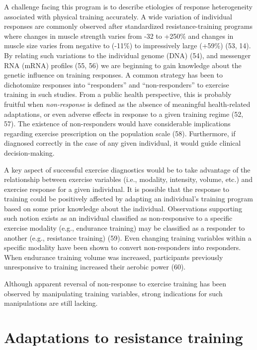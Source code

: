 \documentclass[twoside,10pt]{gihclass} %
\begin{document}
A challenge facing this program is to describe etiologies of response heterogeneity associated with physical training accurately. A wide variation of individual responses are commonly observed after standardized resistance-training programs where changes in muscle strength varies from -32 to +250\% and changes in muscle size varies from negative to (-11\%) to impressively large (+59\%)
(53, 14).
By relating such variations to the individual genome (DNA)
(54),
and messenger RNA (mRNA) profiles
(55, 56)
we are beginning to gain knowledge about the genetic influence on training responses.
A common strategy has been to dichotomize responses into ``responders'' and ``non-responders'' to exercise training in such studies.
From a public health perspective, this is probably fruitful when \emph{non-response} is defined as the absence of meaningful health-related adaptations, or even adverse effects in response to a given training regime
(52, 57).
The existence of non-responders would have considerable implications regarding exercise prescription on the population scale
(58).
Furthermore, if diagnosed correctly in the case of any given individual, it would guide clinical decision-making.

A key aspect of successful exercise diagnostics would be to take advantage of the relationship between exercise variables (i.e., modality, intensity, volume, etc.) and exercise response for a given individual.
It is possible that the response to training could be positively affected by adapting an individual's training program based on some prior knowledge about the individual.
Observations supporting such notion exists as an individual classified as non-responsive to a specific exercise modality (e.g., endurance training) may be classified as a responder to another (e.g., resistance training)
(59).
Even changing training variables within a specific modality have been shown to convert non-responders into responders. When endurance training volume was increased, participants previously unresponsive to training increased their aerobic power
(60).

Although apparent reversal of non-response to exercise training has been observed by manipulating training variables, strong indications for such manipulations are still lacking.

\hypertarget{adaptations-to-resistance-training}{%
\section{Adaptations to resistance training}\label{adaptations-to-resistance-training}}
\end{document}
